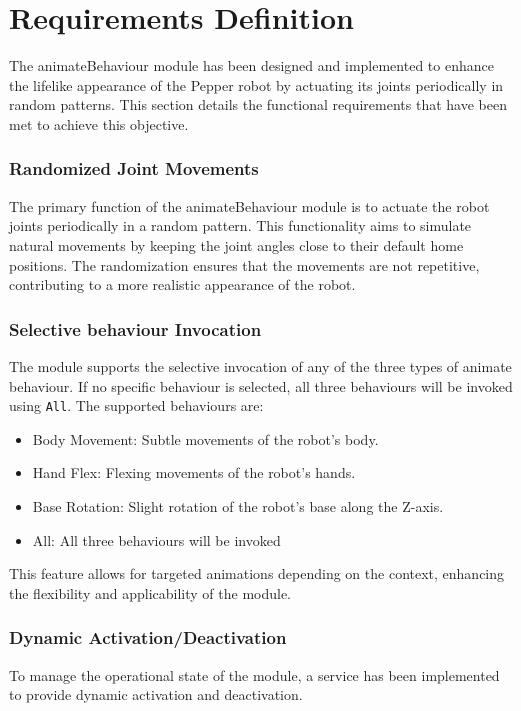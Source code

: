 \documentclass{CSSRforAfrica}
\begin{document}
\section{Requirements Definition}
The animateBehaviour module has been designed and implemented to enhance the lifelike appearance of the Pepper robot by actuating its joints periodically in random patterns. This section details the functional requirements that have been met to achieve this objective.
\subsubsection*{Randomized Joint Movements}
The primary function of the animateBehaviour module is to actuate the robot joints periodically in a random pattern. This functionality aims to simulate natural movements by keeping the joint angles close to their default home positions. The randomization ensures that the movements are not repetitive, contributing to a more realistic appearance of the robot.
\subsubsection*{Selective behaviour Invocation}
The module supports the selective invocation of any of the three types of animate behaviour. If no specific behaviour is selected, all three behaviours will be invoked using \texttt{All}. The supported behaviours are:
\begin{itemize}
    \item Body Movement: Subtle movements of the robot's body.
    \item Hand Flex: Flexing movements of the robot's hands.
    \item Base Rotation: Slight rotation of the robot's base along the Z-axis.
    \item All: All three behaviours will be invoked
\end{itemize}
This feature allows for targeted animations depending on the context, enhancing the flexibility and applicability of the module. 
\subsubsection*{Dynamic Activation/Deactivation}
To manage the operational state of the module, a service has been implemented to provide dynamic activation and deactivation. 
\end{document}
